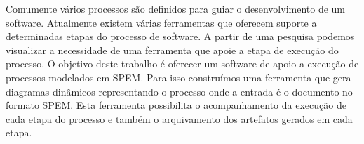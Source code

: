 \begin{resumo}%
 
Comumente vários processos são definidos para guiar o desenvolvimento de um software. Atualmente existem várias ferramentas que oferecem suporte a determinadas etapas do processo de software. A partir de uma pesquisa podemos visualizar a necessidade de uma ferramenta que apoie a etapa de execução do processo. O objetivo deste trabalho é oferecer um software de apoio a execução de processos modelados em SPEM. Para isso construímos uma ferramenta que gera diagramas dinâmicos representando o processo onde a entrada é o documento no formato SPEM. Esta ferramenta possibilita o acompanhamento da execução de cada etapa do processo e também o arquivamento dos artefatos gerados em cada etapa.
 

\end{resumo}
